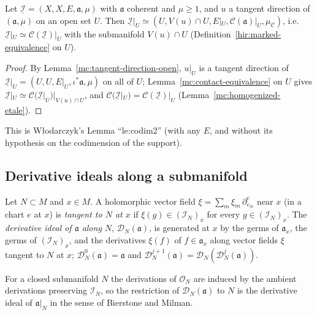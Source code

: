 \begin{lemma}
\label{mc:contact-equivalence-open}
\leanok
Let \(\underline{\mathcal I}=(X,X,E,\mathfrak a,\mu)\) with \(\mathfrak a\) coherent and \(\mu\ge1\), and \(u\) a tangent direction of \((\mathfrak a,\mu)\) on an
open set \(U\). Then \(\underline{\mathcal I}|_U\simeq(U,V(u)\cap U,E|_U,\mathcal C(\mathfrak a)|_U,\mu_{\mathcal C})\), i.e.\
\(\underline{\mathcal I}|_U\simeq\mathcal C(\underline{\mathcal I})|_U\) with the submanifold \(V(u)\cap U\) (Definition~\ref{hir:marked-equivalence} on
\(U\)).
\end{lemma}
\begin{proof}
\leanok
By Lemma~\ref{mc:tangent-direction-open}, \(u|_U\) is a tangent direction of \(\underline{\mathcal I}|_U=(U,U,E|_U,\iota^*\mathfrak a,\mu)\) on all of \(U\);
Lemma~\ref{mc:contact-equivalence} on \(U\) gives \(\underline{\mathcal I}|_U\simeq\mathcal C(\underline{\mathcal I}|_U)|_{V(u)\cap U}\), and
\(\mathcal C(\underline{\mathcal I}|_U)=\mathcal C(\underline{\mathcal I})|_U\) (Lemma~\ref{mc:homogenized-etale}).
\end{proof}
This is Włodarczyk's Lemma ``le:codim2'' (with any \(E\), and without its hypothesis on the codimension of the support).

\subsection{Derivative ideals along a submanifold}

\begin{definition}
\label{mc:derivative-along}
\leanok
Let \(N\subset M\) and \(x\in M\). A holomorphic vector field \(\xi=\sum_m\xi_m\,\partial^e_{e_m}\) near \(x\) (in a chart \(e\) at \(x\)) is \emph{tangent to
\(N\) at \(x\)} if \(\xi(g)\in(\mathcal I_N)_x\) for every \(g\in(\mathcal I_N)_x\). The \emph{derivative ideal of \(\mathfrak a\) along \(N\)},
\(\mathcal D_N(\mathfrak a)\), is generated at \(x\) by the germs of \(\mathfrak a_x\), the germs of \((\mathcal I_N)_x\), and the derivatives \(\xi(f)\) of
\(f\in\mathfrak a_x\) along vector fields \(\xi\) tangent to \(N\) at \(x\); \(\mathcal D_N^0(\mathfrak a)=\mathfrak a\) and
\(\mathcal D_N^{j+1}(\mathfrak a)=\mathcal D_N(\mathcal D_N^j(\mathfrak a))\).
\end{definition}
For a closed submanifold \(N\) the derivations of \(\mathcal O_N\) are induced by the ambient derivations preserving \(\mathcal I_N\), so the restriction
of \(\mathcal D_N(\mathfrak a)\) to \(N\) is the derivative ideal of \(\mathfrak a|_N\) in the sense of Bierstone and Milman.

